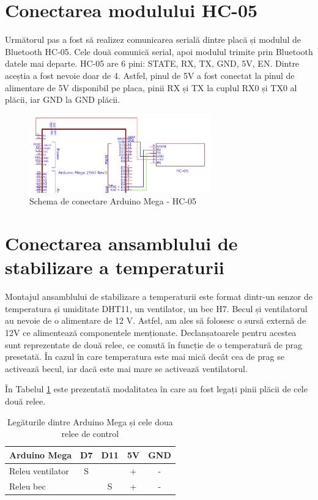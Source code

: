 \section{Conectarea modulului HC-05}
Următorul pas a fost să realizez comunicarea serială dintre placă și modulul de Bluetooth HC-05. Cele două comunică serial, apoi modulul trimite prin Bluetooth datele mai departe. HC-05 are 6 pini: STATE, RX, TX, GND, 5V, EN. Dintre aceștia a fost nevoie doar de 4. Astfel, pinul de 5V a fost conectat la pinul de alimentare de 5V disponibil pe placa, pinii RX și TX la cuplul RX0 și TX0 al plăcii, iar GND la GND plăcii.

\begin{figure}[H]
\includegraphics[width=0.7\textwidth, height=0.3\textwidth]{bachelors_ro/images/conexiune_mega_hc05.png}
\caption{Schema de conectare Arduino Mega - HC-05}
\label{fig:conexiune_mega_hc05}
\end{figure}

\section{Conectarea ansamblului de stabilizare a temperaturii}
Montajul ansamblului de stabilizare a temperaturii este format dintr-un senzor de temperatura și umiditate DHT11, un ventilator, un bec H7. Becul și ventilatorul au nevoie de o alimentare de 12 V. Astfel, am ales să folosesc o sursă externă de 12V ce alimentează componentele menționate. Declanșatoarele pentru acestea sunt reprezentate de două relee, ce comută în funcție de o temperatură de prag presetată. În cazul în care temperatura este mai mică decât cea de prag se activează becul, iar dacă este mai mare se activează ventilatorul. 

În Tabelul \ref{tab:conexiune_mega_relee} este prezentată modalitatea în care au fost legați pinii plăcii de cele două relee.
\begin{table}[H]
\caption{Legăturile dintre Arduino Mega și cele doua relee de control}
\label{tab:conexiune_mega_relee}
\begin{tabular}{|l|c|c|c|c|}
\hline
Arduino Mega     & D7 & D11 & 5V & GND \\ \hline
Releu ventilator & S  &     & +  & -   \\ \hline
Releu bec        &    & S   & +  & -   \\ \hline
\end{tabular}
\end{table}

